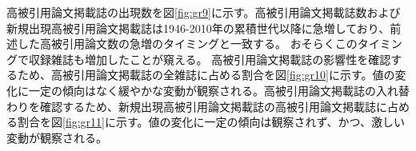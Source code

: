 高被引用論文掲載誌の出現数を図\ref{fig:gr9}に示す。高被引用論文掲載誌数および新規出現高被引用論文掲載誌は1946-2010年の累積世代以降に急増しており、前述した高被引用論文数の急増のタイミングと一致する。
おそらくこのタイミングで収録雑誌も増加したことが窺える。
高被引用論文掲載誌の影響性を確認するため、高被引用論文掲載誌の全雑誌に占める割合を図\ref{fig:gr10}に示す。値の変化に一定の傾向はなく緩やかな変動が観察される。高被引用論文掲載誌の入れ替わりを確認するため、新規出現高被引用論文掲載誌の高被引用論文掲載誌に占める割合を図\ref{fig:gr11}に示す。値の変化に一定の傾向は観察されず、かつ、激しい変動が観察される。

